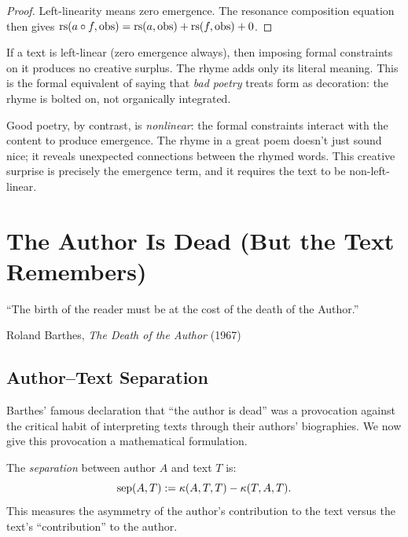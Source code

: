 \begin{proof}
Left-linearity means zero emergence.  The resonance composition
equation then gives $\mathrm{rs}(a \circ f, \mathrm{obs}) = \mathrm{rs}(a, \mathrm{obs}) +
\mathrm{rs}(f, \mathrm{obs}) + 0$.
\end{proof}

\begin{interpretation}
If a text is left-linear (zero emergence always), then imposing formal
constraints on it produces no creative surplus.  The rhyme adds only its
literal meaning.  This is the formal equivalent of saying that
\emph{bad poetry} treats form as decoration: the rhyme is bolted on,
not organically integrated.

Good poetry, by contrast, is \emph{nonlinear}: the formal constraints
interact with the content to produce emergence.  The rhyme in a great
poem doesn't just sound nice; it reveals unexpected connections between
the rhymed words.  This creative surprise is precisely the emergence
term, and it requires the text to be non-left-linear.
\end{interpretation}



\chapter{The Author Is Dead (But the Text Remembers)}
\label{ch:author}

\epigraph{``The birth of the reader must be at the cost of the death
of the Author.''}{Roland Barthes, \textit{The Death of the Author} (1967)}

\section{Author--Text Separation}

Barthes' famous declaration that ``the author is dead'' was a provocation
against the critical habit of interpreting texts through their authors'
biographies.  We now give this provocation a mathematical formulation.

\begin{definition}
The \emph{separation} between author $A$ and text $T$ is:
\[
  \mathrm{sep}(A, T) := \kappa(A, T, T) - \kappa(T, A, T).
\]
This measures the asymmetry of the author's contribution to the text
versus the text's ``contribution'' to the author.
\end{definition}

